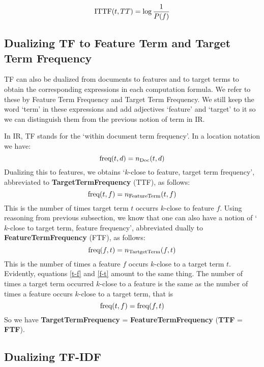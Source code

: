 \begin{equation}
\label{ittf}
 \textmd{ITTF}(t, TT) =  \log{\frac{1}{P(f)}}
\end{equation}


\subsection{Dualizing TF to Feature Term and Target Term Frequency}
\label{subsec-TF}

TF can also be dualized from documents to features and to target terms to obtain the corresponding expressions in each computation formula.  We refer to these by Feature Term Frequency and Target Term  Frequency. We still keep the  word `term'  in these expressions and add adjectives `feature' and `target'  to it so we can distinguish them from the previous notion of term in IR. 

In IR, TF stands for the `within document term frequency'. In a location notation we have:
\[
\textmd{freq}(t,d) = n_{\textmd{Doc}}(t,d)
\]
Dualizing this to features, we obtains `$k$-close to feature, target  term frequency', abbreviated to {\bf TargetTermFrequency} (TTF), as follows:
\begin{equation}
\label{t-f}
\textmd{freq}(t,f) = n_{\textmd{FeatureTerm}}(t,f)
\end{equation}
This is the number of times target  term $t$ occurrs $k$-close to feature $f$.  Using reasoning from previous subsection, we know that one can also have a notion of `$k$-close to target term, feature frequency', abbreviated dually to {\bf FeatureTermFrequency} (FTF), as follows:
\begin{equation}
\label{f-t}
\textmd{freq}(f,t) = n_{\textmd{TartgetTerm}}(f,t)
\end{equation}
This is the number of times a feature $f$ occurs $k$-close to a target term $t$.  Evidently, equations \ref{t-f} and \ref{f-t} amount to the same thing. The number of times a target term occurred $k$-close to a feature is the same as the number of times a feature occurs $k$-close to a target term, that is
\begin{equation}
\label{ttf=ftf}
\textmd{freq}(t,f) = \textmd{freq}(f,t) 
\end{equation}
So we have {\bf TargetTermFrequency}  = {\bf FeatureTermFrequency} ({\bf TTF} = {\bf FTF}). 

\subsection{Dualizing TF-IDF}
\label{subsec-TF-IDF}

